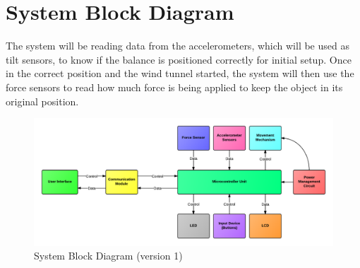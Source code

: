 \section{System Block Diagram}


	The system will be reading data from the accelerometers, which will be used as tilt sensors, to know if the balance is positioned correctly for initial setup. Once in the correct position and the wind tunnel started, the system will then use the force sensors to read how much force is being applied to keep the object in its original position. 

	\begin{figure}[H]
		\centering
			\includegraphics[scale=0.30]{img/systembdv1}
		\caption{System Block Diagram (version 1)}
	\end{figure}